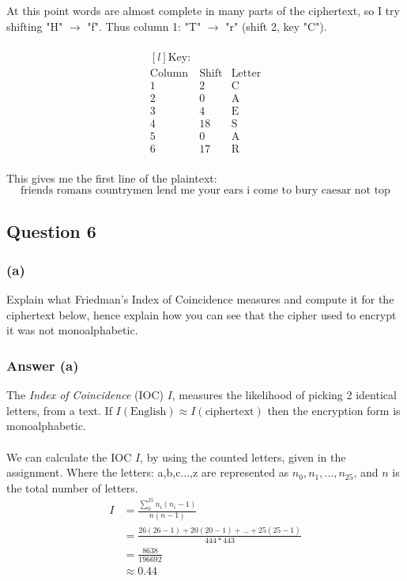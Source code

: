 \documentclass{article}
\begin{document}
	At this point words are almost complete in many parts of the ciphertext, so I try shifting "H" $\rightarrow$ "f". Thus column 1: "T" $\rightarrow$ "r" (shift 2, key "C").
	\\\\
	\[
	\begin{matrix*}[l]
	\text{Key:} \\
	\text{Column}&\text{Shift}&\text{Letter} \\
	1 & 2& \text{C} \\
	2 & 0& \text{A} \\
	3 & 4& \text{E} \\
	4 & 18& \text{S} \\
	5 & 0& \text{A} \\
	6 & 17& \text{R} 
	\end{matrix*}
	\]
	\\
	This gives me the first line of the plaintext: 
	$$
	\text{friends romans countrymen lend me your ears i come to bury  caesar not top}
	$$
	
	\subsection*{Question 6}
	\subsubsection*{(a)}
	Explain what Friedman’s Index of Coincidence measures and compute it for the
	ciphertext below, hence explain how you can see that the cipher used to encrypt it was not monoalphabetic.
	
	\subsubsection*{Answer (a)}
	The \textit{Index of Coincidence} (IOC) $I$, measures the likelihood of picking 2 identical letters, from a text. If $I(\text{English}) \approx I(\text{ciphertext})$ then the encryption form is monoalphabetic.
	\\\\
	We can calculate the IOC $I$, by using the counted letters, given in the assignment. Where the  letters: a,b,c...,z are represented as $n_0,n_1,...,n_{25}$, and $n$ is the total number of letters. 
	\[
	\begin{split}
	I &= \frac{\sum_{0}^{25}n_i(n_i-1)}{n(n-1)} \\
	&=\frac{26(26-1)+20(20-1)+...+25(25-1)}{444*443} \\
	&=\frac{8638}{196692} \\
	&\approx0.44
	\end{split}
	\]
	
\end{document}
